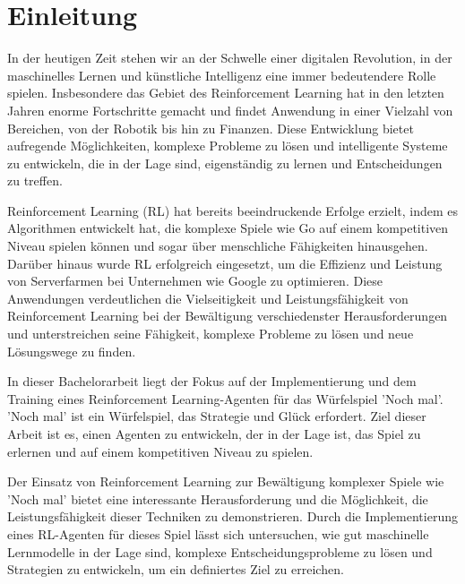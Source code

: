 
\chapter{Einleitung}

In der heutigen Zeit stehen wir an der Schwelle einer digitalen Revolution, in der maschinelles Lernen und künstliche Intelligenz eine immer bedeutendere Rolle spielen. Insbesondere das Gebiet des Reinforcement Learning hat in den letzten Jahren enorme Fortschritte gemacht und findet Anwendung in einer Vielzahl von Bereichen, von der Robotik bis hin zu Finanzen. Diese Entwicklung bietet aufregende Möglichkeiten, komplexe Probleme zu lösen und intelligente Systeme zu entwickeln, die in der Lage sind, eigenständig zu lernen und Entscheidungen zu treffen.

Reinforcement Learning (RL) hat bereits beeindruckende Erfolge erzielt, indem es Algorithmen entwickelt hat, die komplexe Spiele wie Go auf einem kompetitiven Niveau spielen können und sogar über menschliche Fähigkeiten hinausgehen. Darüber hinaus wurde RL erfolgreich eingesetzt, um die Effizienz und Leistung von Serverfarmen bei Unternehmen wie Google zu optimieren. Diese Anwendungen verdeutlichen die Vielseitigkeit und Leistungsfähigkeit von Reinforcement Learning bei der Bewältigung verschiedenster Herausforderungen und unterstreichen seine Fähigkeit, komplexe Probleme zu lösen und neue Lösungswege zu finden.

In dieser Bachelorarbeit liegt der Fokus auf der Implementierung und dem Training eines Reinforcement Learning-Agenten für das Würfelspiel 'Noch mal'. 'Noch mal' ist ein Würfelspiel, das Strategie und Glück erfordert. Ziel dieser Arbeit ist es, einen Agenten zu entwickeln, der in der Lage ist, das Spiel zu erlernen und auf einem kompetitiven Niveau zu spielen.

\newpage
Der Einsatz von Reinforcement Learning zur Bewältigung komplexer Spiele wie 'Noch mal' bietet eine interessante Herausforderung und die Möglichkeit, die Leistungsfähigkeit dieser Techniken zu demonstrieren. Durch die Implementierung eines RL-Agenten für dieses Spiel lässt sich untersuchen, wie gut maschinelle Lernmodelle in der Lage sind, komplexe Entscheidungsprobleme zu lösen und Strategien zu entwickeln, um ein definiertes Ziel zu erreichen.

